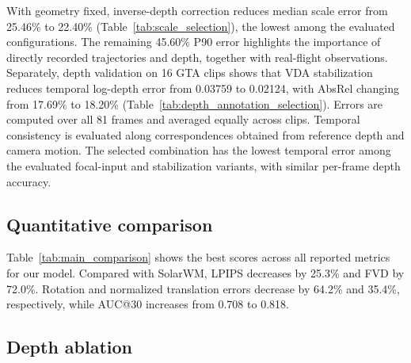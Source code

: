 With geometry fixed, inverse-depth correction reduces median scale error from 25.46\% to 22.40\% (Table~\ref{tab:scale_selection}), the lowest among the evaluated configurations.
The remaining 45.60\% P90 error highlights the importance of directly recorded trajectories and depth, together with real-flight observations.
Separately, depth validation on 16 GTA clips shows that VDA stabilization reduces temporal log-depth error from 0.03759 to 0.02124, with AbsRel changing from 17.69\% to 18.20\% (Table~\ref{tab:depth_annotation_selection}).
Errors are computed over all 81 frames and averaged equally across clips.
Temporal consistency is evaluated along correspondences obtained from reference depth and camera motion.
The selected combination has the lowest temporal error among the evaluated focal-input and stabilization variants, with similar per-frame depth accuracy.


\subsection{Quantitative comparison}
\label{sec:experiment_results}

Table~\ref{tab:main_comparison} shows the best scores across all reported metrics for our model.
Compared with SolarWM, LPIPS decreases by 25.3\% and FVD by 72.0\%.
Rotation and normalized translation errors decrease by 64.2\% and 35.4\%, respectively, while AUC@30 increases from 0.708 to 0.818.

\subsection{Depth ablation}
\label{sec:depth_ablation}

